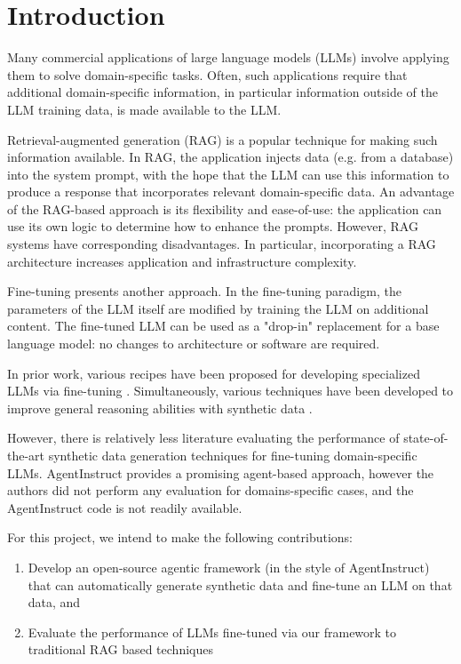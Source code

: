 \section{Introduction}
Many commercial applications of large language models (LLMs) involve applying them to solve domain-specific tasks. Often, such applications require that additional domain-specific information, in particular information outside of the LLM training data, is made available to the LLM.

Retrieval-augmented generation (RAG) \citep{lewis_retrieval-augmented_2020} is a
popular technique for making such information available. In RAG, the application
injects data (e.g. from a database) into the system prompt, with the hope that
the LLM can use this information to produce a response that incorporates
relevant domain-specific data. An advantage of the RAG-based approach is its
flexibility and ease-of-use: the application can use its own logic to determine
how to enhance the prompts. However, RAG systems have corresponding
disadvantages. In particular, incorporating a RAG architecture increases
application and infrastructure complexity.

Fine-tuning presents another approach. In the fine-tuning paradigm, the parameters of the LLM itself are modified by training the LLM on additional content. The fine-tuned LLM can be used as a "drop-in" replacement for a base language model: no changes to architecture or software are required.

In prior work, various recipes have been proposed for developing specialized LLMs via fine-tuning \citep{balaguer_rag_2024,yang_fingpt_2023,wu_pmc-llama_2023}. Simultaneously, various techniques have been developed to improve general reasoning abilities with synthetic data \citep{shao_synthetic_2023,wang_self-instruct_2023,mitra_agentinstruct_2024}.

However, there is relatively less literature evaluating the performance of
state-of-the-art synthetic data generation techniques for fine-tuning
domain-specific LLMs. AgentInstruct \citep{mitra_agentinstruct_2024} provides a promising
agent-based approach, however the authors did not perform any evaluation for
domains-specific cases, and the AgentInstruct code is not readily available.

For this project, we intend to make the following contributions:

\begin{enumerate}
\item Develop an open-source agentic framework (in the style of AgentInstruct)
that can automatically generate synthetic data and fine-tune an LLM on that
data, and
\item Evaluate the performance of LLMs fine-tuned via our framework to
traditional RAG based techniques
\end{enumerate}
